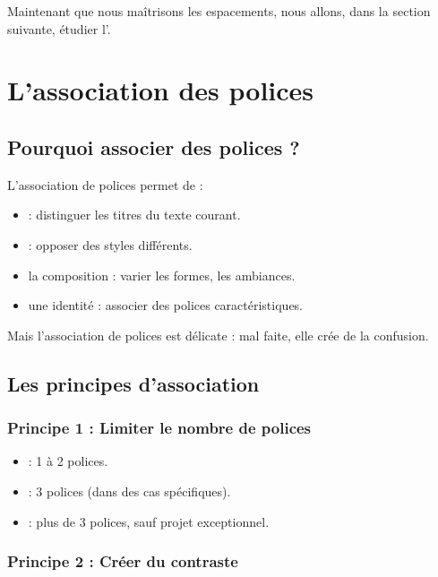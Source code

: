 Maintenant que nous maîtrisons les espacements, nous allons, dans la section suivante, étudier l'.

\section{L'association des polices}

\subsection{Pourquoi associer des polices ?}

L'association de polices permet de :

\begin{itemize}
    \item {} : distinguer les titres du texte courant.
    \item {} : opposer des styles différents.
    \item {} la composition : varier les formes, les ambiances.
    \item {} une identité : associer des polices caractéristiques.
\end{itemize}

Mais l'association de polices est délicate : mal faite, elle crée de la confusion.

\subsection{Les principes d'association}

\subsubsection{Principe 1 : Limiter le nombre de polices}

\begin{itemize}
    \item {} : 1 à 2 polices.
    \item {} : 3 polices (dans des cas spécifiques).
    \item {} : plus de 3 polices, sauf projet exceptionnel.
\end{itemize}

\subsubsection{Principe 2 : Créer du contraste}

